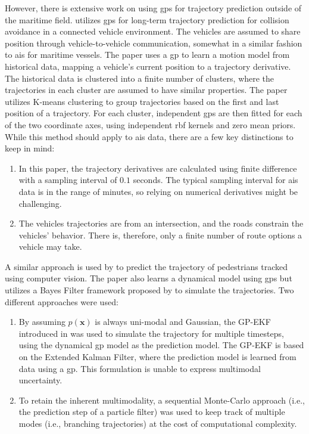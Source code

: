 However, there is extensive  work on using \acrshort{gp}s for trajectory prediction outside of the maritime field. \citeauthor{vehicle_gp_prediction} \cite{vehicle_gp_prediction} utilizes \acrshort{gp}s for long-term trajectory prediction for collision avoidance in a connected vehicle environment. The vehicles are assumed to share position through vehicle-to-vehicle communication, somewhat in a similar fashion to \acrshort{ais} for maritime vessels. The paper uses a \acrshort{gp} to learn a motion model from historical data, mapping a vehicle's current position to a trajectory derivative. The historical data is clustered into a finite number of clusters, where the trajectories in each cluster are assumed to have similar properties. The paper utilizes K-means clustering \cite{murphy} to group trajectories based on the first and last position of a trajectory. For each cluster, independent \acrshort{gp}s are then fitted for each of the two coordinate axes, using independent \acrshort{rbf} kernels and zero mean priors. While this method should apply to \acrshort{ais} data, there are a few key distinctions to keep in mind:
\begin{enumerate}
    \item In this paper, the trajectory derivatives are calculated using finite difference with a sampling interval of $0.1$ seconds. The typical sampling interval for \acrshort{ais} data is in the range of minutes, so relying on numerical derivatives might be challenging.
    \item The vehicles trajectories are from an intersection, and the roads constrain the vehicles' behavior. There is, therefore, only a finite number of route options a vehicle may take.
\end{enumerate}

A similar approach is used by \citeauthor{pedestrian} \cite{pedestrian} to predict the trajectory of pedestrians tracked using computer vision. The paper also learns a dynamical model using \acrshort{gp}s but utilizes a Bayes Filter framework proposed by \citeauthor{gpekf} \cite{gpekf} to simulate the trajectories. Two different approaches were used:
\begin{enumerate}
    \item By assuming $p(\boldsymbol{x})$ is always uni-modal and Gaussian, the GP-EKF introduced in \cite{gpekf} was used to simulate the trajectory for multiple timesteps, using the dynamical \acrshort{gp} model as the prediction model. The GP-EKF is based on the Extended Kalman Filter, where the prediction model is learned from data using a \acrshort{gp}. This formulation is unable to express multimodal uncertainty.
    \item To retain the inherent multimodality, a sequential Monte-Carlo approach (i.e., the prediction step of a particle filter) was used to keep track of multiple modes (i.e., branching trajectories) at the cost of computational complexity.  
\end{enumerate}

